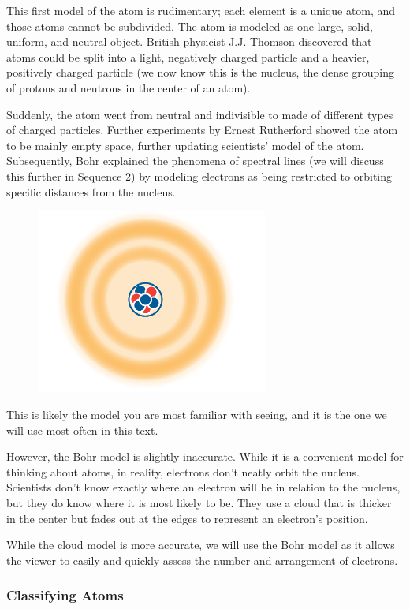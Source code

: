 This first model of the atom is rudimentary; each element is a unique atom,
and those atoms cannot be subdivided. The atom is modeled as one large, solid,
uniform, and neutral object. British physicist J.J. Thomson discovered that
atoms could be split into a light, negatively charged particle and a heavier,
positively charged particle (we now know this is the nucleus, the dense
grouping of protons and neutrons in the center of an atom).

Suddenly, the atom went from neutral and indivisible to made of different types
of charged particles. Further experiments by Ernest Rutherford showed the atom
to be mainly empty space, further updating scientists' model of the atom.
Subsequently, Bohr explained the phenomena of spectral lines (we will discuss
this further in Sequence 2) by modeling electrons as being restricted to
orbiting specific distances from the nucleus.

\begin{figure}
\noindent\includegraphics[width=3in]{atomCloud.png}
\end{figure}

This is likely the model you are most familiar with seeing, and it is the one we
will use most often in this text.

However, the Bohr model is slightly inaccurate. While it is a convenient model for
thinking about atoms, in reality, electrons don't neatly orbit the nucleus.
Scientists don't know exactly where an electron will be in relation to the
nucleus, but they do know where it is most likely to be. They use a cloud that is
thicker in the center but fades out at the edges to represent an electron's
position.

While the cloud model is more accurate, we will use the Bohr model as it
allows the viewer to easily and quickly assess the number and arrangement of
electrons.

\subsubsection{Classifying Atoms}

